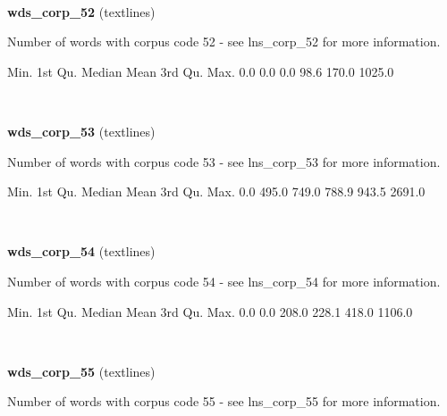 \documentclass[]{article}
\newenvironment{Shaded}{\begin{snugshade}}{\end{snugshade}}
\newcommand{\FloatTok}[1]{\textcolor[rgb]{0.00,0.00,0.81}{{#1}}}
\newcommand{\NormalTok}[1]{{#1}}
\begin{document}
~

\vspace{1em}

\textbf{wds\_corp\_52} (textlines)

Number of words with corpus code 52 - see lns\_corp\_52 for more
information.

\begin{Shaded}
\begin{Highlighting}[]
   \NormalTok{Min. 1st Qu.  Median    Mean 3rd Qu.    Max. }
    \FloatTok{0.0}     \FloatTok{0.0}     \FloatTok{0.0}    \FloatTok{98.6}   \FloatTok{170.0}  \FloatTok{1025.0} 
\end{Highlighting}
\end{Shaded}

~

\vspace{1em}

\textbf{wds\_corp\_53} (textlines)

Number of words with corpus code 53 - see lns\_corp\_53 for more
information.

\begin{Shaded}
\begin{Highlighting}[]
   \NormalTok{Min. 1st Qu.  Median    Mean 3rd Qu.    Max. }
    \FloatTok{0.0}   \FloatTok{495.0}   \FloatTok{749.0}   \FloatTok{788.9}   \FloatTok{943.5}  \FloatTok{2691.0} 
\end{Highlighting}
\end{Shaded}

~

\vspace{1em}

\textbf{wds\_corp\_54} (textlines)

Number of words with corpus code 54 - see lns\_corp\_54 for more
information.

\begin{Shaded}
\begin{Highlighting}[]
   \NormalTok{Min. 1st Qu.  Median    Mean 3rd Qu.    Max. }
    \FloatTok{0.0}     \FloatTok{0.0}   \FloatTok{208.0}   \FloatTok{228.1}   \FloatTok{418.0}  \FloatTok{1106.0} 
\end{Highlighting}
\end{Shaded}

~

\vspace{1em}

\textbf{wds\_corp\_55} (textlines)

Number of words with corpus code 55 - see lns\_corp\_55 for more
information.
\end{document}
